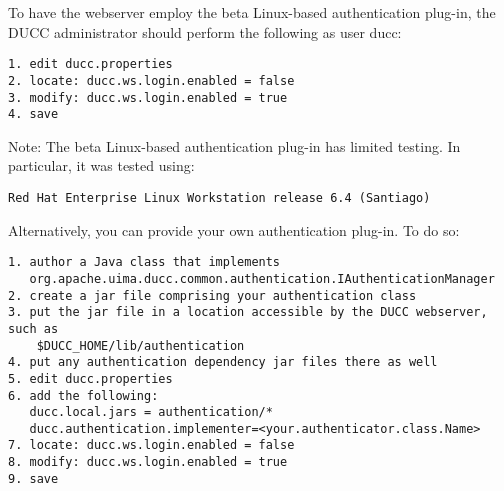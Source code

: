     To have the webserver employ the beta Linux-based authentication plug-in,
    the DUCC administrator should perform the following as user ducc:
\begin{verbatim}    
1. edit ducc.properties
2. locate: ducc.ws.login.enabled = false
3. modify: ducc.ws.login.enabled = true
4. save
\end{verbatim}

    Note: The beta Linux-based authentication plug-in has limited testing.
    In particular, it was tested using:
\begin{verbatim}
Red Hat Enterprise Linux Workstation release 6.4 (Santiago)
\end{verbatim}    
    
    Alternatively, you can provide your own authentication plug-in.  To do so:
\begin{verbatim}    
1. author a Java class that implements 
   org.apache.uima.ducc.common.authentication.IAuthenticationManager
2. create a jar file comprising your authentication class
3. put the jar file in a location accessible by the DUCC webserver, such as 
    $DUCC_HOME/lib/authentication
4. put any authentication dependency jar files there as well
5. edit ducc.properties
6. add the following:
   ducc.local.jars = authentication/*
   ducc.authentication.implementer=<your.authenticator.class.Name>
7. locate: ducc.ws.login.enabled = false
8. modify: ducc.ws.login.enabled = true
9. save   
\end{verbatim}    

